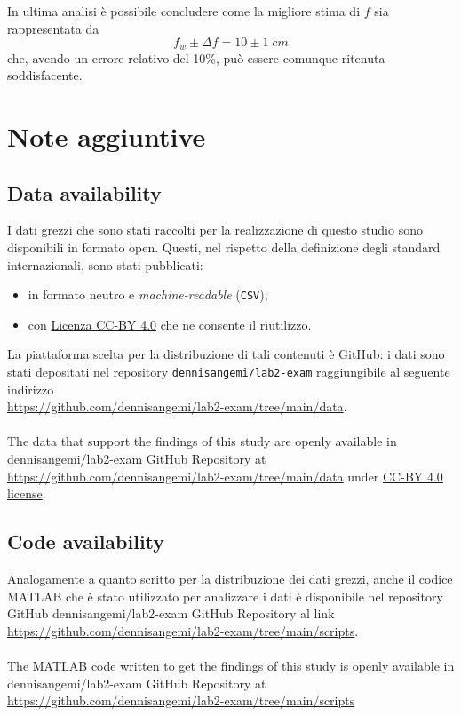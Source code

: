 \documentclass[11pt,a4paper]{article}
\begin{document}
In ultima analisi è possibile concludere come la migliore stima di $f$ sia rappresentata da
\begin{equation}
    f_w \pm \Delta f = 10 \pm 1 \; cm
    \label{f-end}
\end{equation}
che, avendo un errore relativo del 10\%, può essere comunque ritenuta soddisfacente.

\section{Note aggiuntive}

\subsection{Data availability}
I dati grezzi che sono stati raccolti per la realizzazione di questo studio sono disponibili in formato open. Questi, nel rispetto della definizione degli standard internazionali, sono stati pubblicati:
\begin{itemize}
    \item in formato neutro e \textit{machine-readable} (\texttt{CSV});
    \item con \href{https://creativecommons.org/licenses/by/4.0/}{Licenza CC-BY 4.0} che ne consente il riutilizzo.
\end{itemize}
La piattaforma scelta per la distribuzione di tali contenuti è GitHub: i dati sono stati depositati nel  repository \texttt{dennisangemi/lab2-exam} raggiungibile al seguente indirizzo\\\href{https://github.com/dennisangemi/lab2-exam}{https://github.com/dennisangemi/lab2-exam/tree/main/data}.
\\ \\
The data that support the findings of this study are openly available in dennisangemi/lab2-exam GitHub Repository at \href{https://github.com/dennisangemi/lab2-exam}{https://github.com/dennisangemi/lab2-exam/tree/main/data} under \href{https://creativecommons.org/licenses/by/4.0/}{CC-BY 4.0 license}.

\subsection{Code availability}
Analogamente a quanto scritto per la distribuzione dei dati grezzi, anche il codice MATLAB che è stato utilizzato per analizzare i dati è disponibile nel repository GitHub dennisangemi/lab2-exam GitHub Repository al link
\href{https://github.com/dennisangemi/lab2-exam/tree/main/scripts}{https://github.com/dennisangemi/lab2-exam/tree/main/scripts}.
\\ \\
The MATLAB code written to get the findings of this study is openly available in dennisangemi/lab2-exam GitHub Repository at \href{https://github.com/dennisangemi/lab2-exam/tree/main/scripts}{https://github.com/dennisangemi/lab2-exam/tree/main/scripts}
\end{document}
